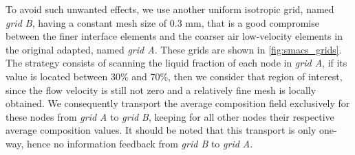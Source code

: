 To avoid such unwanted effects, we use another uniform
isotropic grid, named \emph{grid B}, having a constant mesh size of 0.3 mm, that is a good compromise between the finer interface elements and the coarser air low-velocity elements
in the original adapted, named \emph{grid A}.
These grids are shown in \cref{fig:smacs_grids}.
The strategy consists of scanning the liquid fraction of each node in \emph{grid A}, if its value is located between 30\% and 70\%, then we consider that 
region of interest, since the flow velocity is still not zero and a relatively fine mesh is locally obtained. 
We consequently transport the average composition field exclusively 
for these nodes from \emph{grid A} to \emph{grid B}, keeping for all other nodes their respective average composition values.
It should be noted that this transport is only one-way, hence no information feedback from \emph{grid B} to \emph{grid A}.

